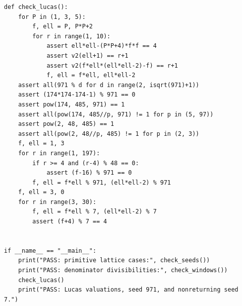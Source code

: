 \documentclass[11pt,a4paper]{article}
\numberwithin{equation}{section}
\theoremstyle{definition}
\theoremstyle{remark}
\begin{document}
\begin{lstlisting}[style=certificate]
def check_lucas():
    for P in (1, 3, 5):
        f, ell = P, P*P+2
        for r in range(1, 10):
            assert ell*ell-(P*P+4)*f*f == 4
            assert v2(ell+1) == r+1
            assert v2(f*ell*(ell*ell-2)-f) == r+1
            f, ell = f*ell, ell*ell-2
    assert all(971 % d for d in range(2, isqrt(971)+1))
    assert (174*174-174-1) % 971 == 0
    assert pow(174, 485, 971) == 1
    assert all(pow(174, 485//p, 971) != 1 for p in (5, 97))
    assert pow(2, 48, 485) == 1
    assert all(pow(2, 48//p, 485) != 1 for p in (2, 3))
    f, ell = 1, 3
    for r in range(1, 197):
        if r >= 4 and (r-4) % 48 == 0:
            assert (f-16) % 971 == 0
        f, ell = f*ell % 971, (ell*ell-2) % 971
    f, ell = 3, 0
    for r in range(3, 30):
        f, ell = f*ell % 7, (ell*ell-2) % 7
        assert (f+4) % 7 == 4


if __name__ == "__main__":
    print("PASS: primitive lattice cases:", check_seeds())
    print("PASS: denominator divisibilities:", check_windows())
    check_lucas()
    print("PASS: Lucas valuations, seed 971, and nonreturning seed 7.")


\end{lstlisting}
\end{document}
